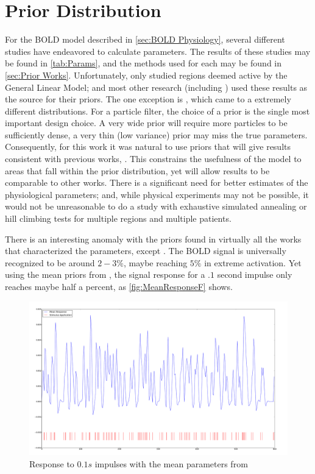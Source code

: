 \section{Prior Distribution}
\label{sec:PriorDist}
For the BOLD model described in \autoref{sec:BOLD Physiology}, several
different studies have endeavored to calculate parameters. The results
of these studies may be found in \autoref{tab:Params}, and the methods 
used for each may be found in \autoref{sec:Prior Works}. Unfortunately,
\cite{Friston2000} only studied regions deemed active by the General 
Linear Model; and most other research (including \cite{Friston2001}) used these results as 
the source for their priors. 
The one exception is \cite{Johnston2008}, which came to a extremely different
distributions. For a particle filter, the choice of a prior is
the single most important design choice. A very wide prior will require
more particles to be sufficiently dense, a very thin (low variance) prior may miss
the true parameters. Consequently, for this work it was natural
to use priors that will give results consistent with previous works, 
\cite{Friston2000}. This constrains the usefulness of the model to
areas that fall within the prior distribution, yet will allow results
to be comparable to other works. There is a significant need for better
estimates of the physiological parameters; and, while physical experiments
may not be possible, it would not be unreasonable to do a study with
exhaustive simulated annealing or hill climbing tests for multiple
regions and multiple patients.

There is an interesting anomaly with the priors found in virtually all
the works that characterized the parameters, except \cite{Johnston2008}.
The BOLD signal is universally recognized to be around $2-3\%$, maybe
reaching $5\%$ in extreme activation. Yet using the mean priors
from \cite{Friston2000}, the signal response for a $.1$ second
impulse only reaches maybe half a percent, as \autoref{fig:MeanResponseF}
shows.

\begin{figure}
\centering
\label{fig:MeanResponseF}
\includegraphics[trim=6cm 3cm 6cm 3cm,width=16cm]{images/mean_response}
\caption{Response to $0.1s$ impulses with the mean parameters from \cite{Friston2000}}
\end{figure}

